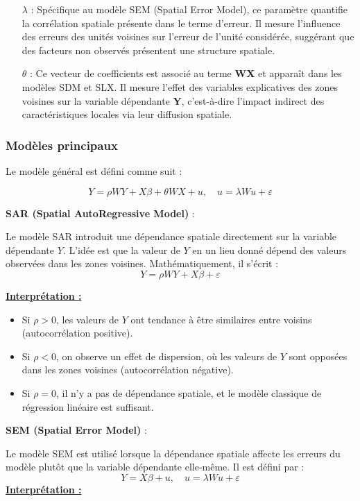 \documentclass[
]{article}
\begin{document}
\begin{itemize}
\item[\(\lambda\)] : Spécifique au modèle SEM (Spatial Error Model), ce paramètre quantifie la corrélation spatiale présente dans le terme d'erreur. Il mesure l'influence des erreurs des unités voisines sur l'erreur de l'unité considérée, suggérant que des facteurs non observés présentent une structure spatiale.
\item[\(\theta\)] : Ce vecteur de coefficients est associé au terme \textbf{WX} et apparaît dans les modèles SDM et SLX. Il mesure l'effet des variables explicatives des zones voisines sur la variable dépendante \textbf{Y}, c'est-à-dire l'impact indirect des caractéristiques locales via leur diffusion spatiale.
\end{itemize}

\subsubsection{Modèles principaux}\label{moduxe8les-principaux}

Le modèle général est défini comme suit :

\[
Y = \rho W Y + X \beta + \theta W X + u, \quad u = \lambda W u + \varepsilon
\]

\textbf{SAR (Spatial AutoRegressive Model)} :

Le modèle SAR introduit une dépendance spatiale directement sur la
variable dépendante \(Y\). L'idée est que la valeur de \(Y\) en un lieu
donné dépend des valeurs observées dans les zones voisines.
Mathématiquement, il s'écrit : \[
Y = \rho W Y + X \beta + \varepsilon
\]

\underline{\textbf{Interprétation :}}

\begin{itemize}
\item Si \( \rho > 0 \), les valeurs de \( Y \) ont tendance à être similaires entre voisins (autocorrélation positive).
\item Si \( \rho < 0 \), on observe un effet de dispersion, où les valeurs de \( Y \) sont opposées dans les zones voisines (autocorrélation négative).
\item Si \( \rho = 0 \), il n’y a pas de dépendance spatiale, et le modèle classique de régression linéaire est suffisant.
\end{itemize}

\textbf{SEM (Spatial Error Model)} :

Le modèle SEM est utilisé lorsque la dépendance spatiale affecte les
erreurs du modèle plutôt que la variable dépendante elle-même. Il est
défini par : \[
Y = X \beta + u, \quad u = \lambda W u + \varepsilon
\] \underline{\textbf{Interprétation :}}
\end{document}
